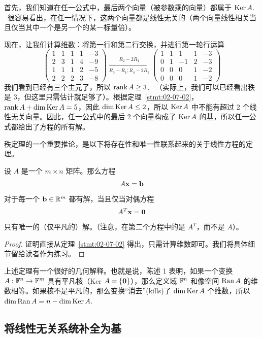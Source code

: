 首先，我们知道在任一公式中，最后两个向量（被参数乘的向量）都属于 $\operatorname{Ker} A$. ~很容易看出，在任一情况下，这两个向量都是线性无关的（两个向量线性相关当且仅当其中一个是另一个的某一标量倍）。

现在，让我们计算维数：将第一行和第二行交换，并进行第一轮行运算
$$
\begin{pmatrix} 1 & 1 & 1 & 1 & -3 \\ 2 & 3 & 1 & 4 & -9 \\ 1 & 1 & 1 & 2 & -5 \\ 2 & 2 & 2 & 3 & -8 \end{pmatrix} \xrightarrow[{R_3-R_1; }{R_4-2R_1}]{R_2-2R_1} \begin{pmatrix} 1 & 1 & 1 & 1 & -3 \\ 0 & 1 & -1 & 2 & -3 \\ 0 & 0 & 0 & 1 & -2 \\ 0 & 0 & 0 & 1 & -2 \end{pmatrix}
$$
我们看到已经有三个主元了，所以 $\operatorname{rank} A \ge 3$. ~（实际上，我们可以已经看出秩是 3，但这里只需估计就足够了）。根据定理~\ref{stmt:02-07-02}， $\operatorname{rank} A + \dim \operatorname{Ker} A = 5$，因此 $\dim \operatorname{Ker} A \le 2$，所以 $\operatorname{Ker} A$ 中不能有超过 2 个线性无关向量。因此，任一公式中的最后 2 个向量构成了 $\operatorname{Ker} A$ 的基，所以任一公式都给出了方程的所有解。

秩定理的一个重要推论，是以下将存在性和唯一性联系起来的关于线性方程的定理。

\begin{theorem}\label{stmt:02-07-03}  设 $A$ 是一个 $m \times n$ 矩阵。那么方程
$$A \mathbf{x} = \mathbf{b}$$
对于每一个 $\mathbf{b} \in \mathbb{R}^m$ 都有解，当且仅当对偶方程
$$A^T \mathbf{x} = \mathbf{0}$$
只有唯一的（仅平凡的）解。（注意，在第二个方程中的是 $A^T$，而不是 $A$）。\end{theorem}

\begin{proof} 证明直接从定理~\ref{stmt:02-07-02} 得出，只需计算维数即可。我们将具体细节留给读者作为练习。\end{proof}

上述定理有一个很好的几何解释。也就是说，陈述 1 表明，如果一个变换 $A: \mathbb{F}^n \to \mathbb{F}^m$ 具有平凡核（Ker $A = \{\mathbf{0}\}$），那么定义域 $\mathbb{F}^n$ 和像空间 $\operatorname{Ran} A$ 的维数相等。如果核不是平凡的，那么变换“消去”(kills)了 $\dim \operatorname{Ker} A$ 个维数，所以 $\dim \operatorname{Ran} A = n - \dim \operatorname{Ker} A$.

\subsection{将线性无关系统补全为基}\label{sec:02-07-04}

